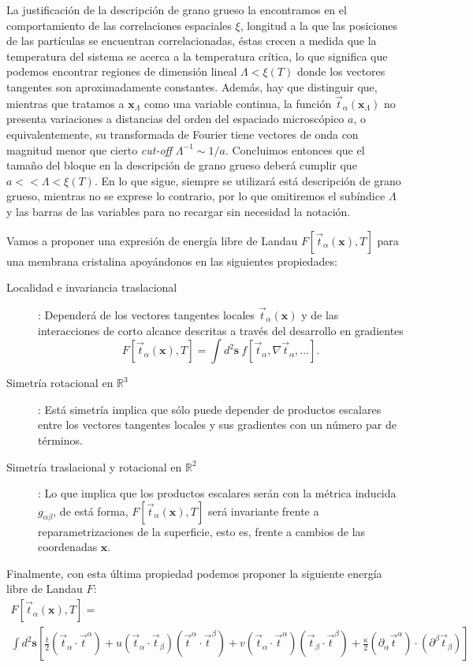 La justificación de la descripción de grano grueso la encontramos en el
comportamiento de las correlaciones espaciales $\xi$, longitud a la que las
posiciones de las partículas se encuentran correlacionadas, éstas crecen a
medida que la temperatura del sistema se acerca a la temperatura crítica, lo
que significa que podemos encontrar regiones de dimensión lineal
$\Lambda<\xi(T)$ donde los vectores tangentes son aproximadamente
constantes. Además, hay que distinguir que, mientras que tratamos a
$\mathbf{x}_{\Lambda}$ como una variable continua, la función 
$\vec{t}_{\alpha}(\mathbf{x}_{\Lambda})$ no presenta variaciones a distancias
del orden del espaciado microscópico $a$, o equivalentemente, su transformada
de Fourier tiene vectores de onda con magnitud menor que cierto \textit{cut-off}
$\Lambda^{-1} \sim 1/a$. Concluimos entonces que el tamaño del bloque en la
descripción de grano grueso deberá cumplir que $a<<\Lambda<\xi(T)$. En lo que
sigue, siempre se utilizará está descripción de grano grueso, mientras no se
exprese lo contrario, por lo que omitiremos el subíndice $\Lambda$ y las
barras de las variables para no recargar sin necesidad la notación.

Vamos a proponer una expresión de energía libre de Landau
$F[\vec{t}_{\alpha}(\mathbf{x}),T]$ para una membrana cristalina
apoyándonos en las siguientes propiedades:
\begin{description}
\item[Localidad e invariancia traslacional]: Dependerá de los vectores
  tangentes locales $\vec{t}_{\alpha}(\mathbf{x})$ y de las
  interacciones de corto alcance descritas a través del desarrollo en gradientes
  $$ F[\vec{t}_{\alpha}(\mathbf{x}),T]=\int\! d^2\mathbf{s}\ f[\vec{t}_{\alpha},\nabla
  \vec{t}_{\alpha},\dots].$$ 
\item[Simetría rotacional en $\mathbb{R}^3$]: Está simetría implica que sólo
  puede depender de productos escalares entre los vectores tangentes
  locales y sus gradientes con un número par de términos. 

\item[Simetría traslacional y rotacional en $\mathbb{R}^2$]: Lo que implica
  que los productos escalares serán con la métrica inducida $g_{\alpha\beta}$,
  de está forma, $F[\vec{t}_{\alpha}(\mathbf{x}),T]$ será invariante frente a
  reparametrizaciones de la superficie, esto es, frente a cambios de 
  las coordenadas $\mathbf{x}$.
\end{description}

 Finalmente, con esta última propiedad podemos proponer la siguiente energía libre de Landau $F$:
  \begin{multline}\label{ELandau}
    F[\vec{t}_{\alpha}(\mathbf{x}),T]=\\
\int d^2\mathbf{s}
    \left[
      \frac{t}{2}(\vec{t}_{\alpha}\cdot\vec{t}^{\alpha})+
      u(\vec{t}_{\alpha}\cdot\vec{t}_{\beta})(\vec{t}^{\alpha}\cdot\vec{t}^{\beta})+
      v(\vec{t}_{\alpha}\cdot\vec{t}^{\alpha})(\vec{t}_{\beta}\cdot\vec{t}^{\beta})+
      \frac{\kappa}{2}(\partial_{\alpha}\vec{t}^{\alpha})\cdot(\partial^{\beta}\vec{t}_{\beta}) \right]
  \end{multline}


